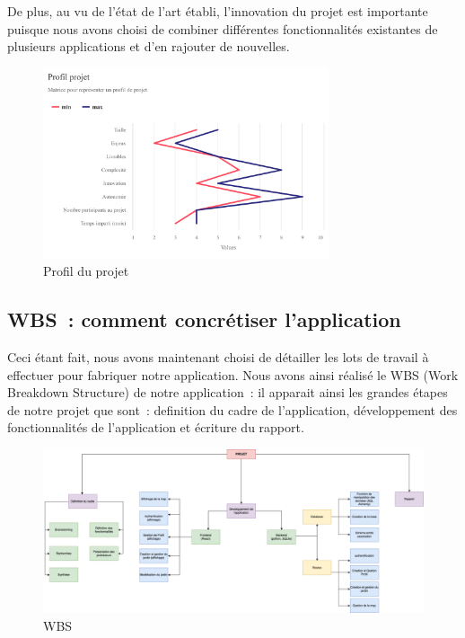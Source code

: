 \documentclass[french,a4paper]{article}
\begin{document}
De plus, au vu de l’état de l’art établi, l’innovation du projet est importante puisque nous avons choisi de combiner différentes fonctionnalités existantes de plusieurs applications et d’en rajouter de nouvelles.

\begin{figure}[H]
    \centering
    \includegraphics[width=0.75\textwidth]{img/profil_projet.png}
    \caption{Profil du projet}
\end{figure} 

\subsection{WBS~: comment concrétiser l’application}
Ceci étant fait, nous avons maintenant choisi de détailler les lots de travail à effectuer pour fabriquer notre application. Nous avons ainsi réalisé le WBS (Work Breakdown Structure) de notre application~: il apparait ainsi les grandes étapes de notre projet que sont~: definition du cadre de l’application, développement des fonctionnalités de l’application et écriture du rapport.
\begin{figure}[H]
    \centering
    \includegraphics[width=1\textwidth]{img/WBS.png}
    \caption{WBS}
\end{figure} 
\end{document}
